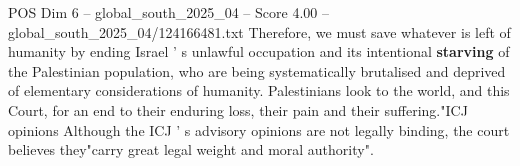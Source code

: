 \begin{textsample}{POS Dim 6 – global\_south\_2025\_04 – Score 4.00 – global\_south\_2025\_04/124166481.txt}
Therefore, we must save whatever is left of humanity by ending Israel ' s unlawful occupation and its intentional \textbf{starving} of the Palestinian population, who are being systematically brutalised and deprived of elementary considerations of humanity.
Palestinians look to the world, and this Court, for an end to their enduring loss, their pain and their suffering."ICJ opinions Although the ICJ ' s advisory opinions are not legally binding, the court believes they"carry great legal weight and moral authority".

\end{textsample}
